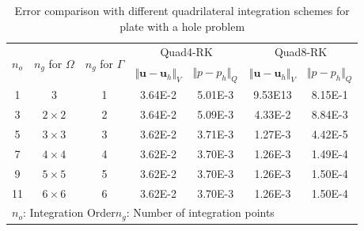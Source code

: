 \begin{table}[H]
\centering
\caption{Error comparison with different quadrilateral integration schemes for plate with a hole problem}
\label{tab_gauss_2}
\begin{tabular}{ccccccc}
\toprule
\multirow{2}{*}{$n_o$} & \multirow{2}{*}{$n_g$ for $\Omega$} & \multirow{2}{*}{$n_g$ for $\Gamma$} & \multicolumn{2}{c}{Quad4-RK} & \multicolumn{2}{c}{Quad8-RK} \\
\shortstack{} & \shortstack{} & \shortstack{} & $\Vert \boldsymbol u-\boldsymbol u_h \Vert_V$ & $\Vert p-p_h \Vert_Q$ & $\Vert \boldsymbol u-\boldsymbol u_h \Vert_V$ & $\Vert p-p_h \Vert_Q$ \\
\midrule
1 & 3 & 1 & 3.64E-2 & 5.01E-3 & 9.53E13 & 8.15E-1 \\
3 & $2\times2$ & 2 & 3.64E-2 & 5.09E-3 & 4.33E-2 & 8.84E-3 \\
5 & $3\times3$ & 3 & 3.62E-2 & 3.71E-3 & 1.27E-3 & 4.42E-5 \\
7 & $4\times4$ & 4 & 3.62E-2 & 3.70E-3 & 1.26E-3 & 1.49E-4 \\
9 & $5\times5$ & 5 & 3.62E-2 & 3.70E-3 & 1.26E-3 & 1.50E-4 \\
11 & $6\times6$ & 6 & 3.62E-2 & 3.70E-3 & 1.26E-3 & 1.50E-4 \\
\multicolumn{7}{l}{\footnotesize{$n_o$: Integration Order\quad $n_g$: Number of integration points}} \\
\bottomrule
\end{tabular}
\end{table}
